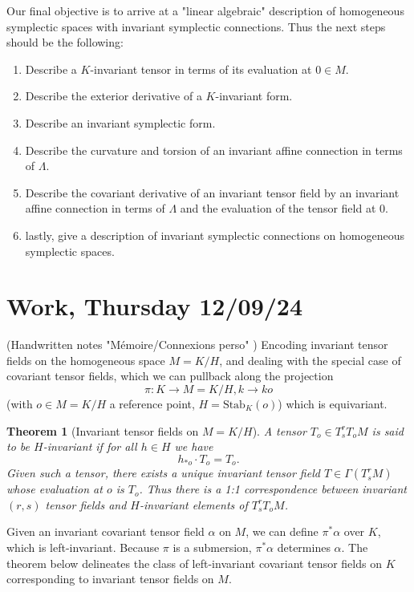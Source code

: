 \documentclass[a4paper,12pt,parskip=half*,chapterprefix=true,numbers=noendperiod]{scrreprt}
\newtheorem{theorem}{Theorem}[section]
\theoremstyle{definition}
\theoremstyle{remark}
\begin{document}
Our final objective is to arrive at a "linear algebraic" description of homogeneous symplectic spaces with invariant symplectic connections. Thus the next steps should be the following:
\begin{enumerate}
	\item Describe a $K$-invariant tensor in terms of its evaluation at $0\in M$.
	\item Describe the exterior derivative of a $K$-invariant form.
	\item Describe an invariant symplectic form.
	\item Describe the curvature and torsion of an invariant affine connection in terms of $\Lambda$.
	\item Describe the covariant derivative of an invariant tensor field by an invariant affine connection in terms of $\Lambda$ and the evaluation of the tensor field at $0$.
	\item lastly, give a description of invariant symplectic connections on homogeneous symplectic spaces.
\end{enumerate}

\section{Work, Thursday 12/09/24}\label{thur12/09/24}

(Handwritten notes "Mémoire/Connexions perso" \cite{personalHand:MasterThesis}) Encoding invariant tensor fields on the homogeneous space $M=K/H$, and dealing with the special case of covariant tensor fields, which we can pullback along the projection
\begin{equation*}
	\pi:K\to M=K/H,k\to ko
\end{equation*}
(with $o\in M=K/H$ a reference point, $H=\text{Stab}_K(o)$) which is equivariant.

\begin{theorem}[Invariant tensor fields on $M=K/H$]
	A tensor $T_o\in T^r_sT_oM$ is said to be $H$-invariant if for all $h\in H$ we have
	\begin{equation*}
		h_{*o}\cdot T_o=T_o.
	\end{equation*}
	Given such a tensor, there exists a unique invariant tensor field $T\in\Gamma(T^r_sM)$ whose evaluation at $o$ is $T_o$. Thus there is a 1:1 correspondence between invariant $(r,s)$ tensor fields and $H$-invariant elements of $T^r_sT_oM$.
\end{theorem}

Given an invariant covariant tensor field $\alpha$ on $M$, we can define $\pi^*\alpha$ over $K$, which is left-invariant. Because $\pi$ is a submersion, $\pi^*\alpha$ determines $\alpha$. The theorem below delineates the class of left-invariant covariant tensor fields on $K$ corresponding to invariant tensor fields on $M$.
\end{document}
